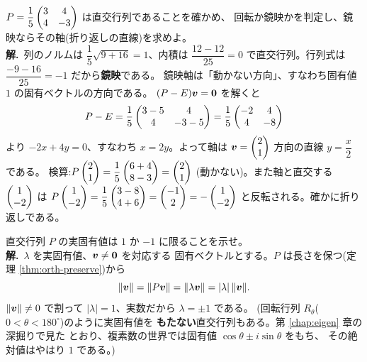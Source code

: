 \begin{rei}[例題・標準(鏡映の判定と軸)]\label{rei:orth-reflection}
$P = \dfrac{1}{5}\begin{pmatrix}3 & 4 \\ 4 & -3\end{pmatrix}$ は直交行列であることを確かめ、
回転か鏡映かを判定し、鏡映ならその軸(折り返しの直線)を求めよ。\\
\textbf{解.}\ 列のノルムは $\dfrac{1}{5}\sqrt{9 + 16} = 1$、内積は
$\dfrac{12 - 12}{25} = 0$ で直交行列。行列式は
$\dfrac{-9 - 16}{25} = -1$ だから\textbf{鏡映}である。
鏡映軸は「動かない方向」、すなわち固有値 $1$ の固有ベクトルの方向である。
$(P - E)\bm{v} = \bm{0}$ を解くと
\[
P - E = \frac{1}{5}\begin{pmatrix}3 - 5 & 4 \\ 4 & -3 - 5\end{pmatrix}
= \frac{1}{5}\begin{pmatrix}-2 & 4 \\ 4 & -8\end{pmatrix}
\]
より $-2x + 4y = 0$、すなわち $x = 2y$。よって軸は
$\bm{v} = \begin{pmatrix}2 \\ 1\end{pmatrix}$ 方向の直線 $y = \dfrac{x}{2}$ である。
検算:$P\begin{pmatrix}2 \\ 1\end{pmatrix} = \dfrac{1}{5}\begin{pmatrix}6 + 4 \\ 8 - 3\end{pmatrix} = \begin{pmatrix}2 \\ 1\end{pmatrix}$
(動かない)。また軸と直交する $\begin{pmatrix}1 \\ -2\end{pmatrix}$ は
$P\begin{pmatrix}1 \\ -2\end{pmatrix} = \dfrac{1}{5}\begin{pmatrix}3 - 8 \\ 4 + 6\end{pmatrix} = \begin{pmatrix}-1 \\ 2\end{pmatrix}
= -\begin{pmatrix}1 \\ -2\end{pmatrix}$ と反転される。確かに折り返しである。
\end{rei}

\begin{rei}[例題・標準(証明:実固有値は $\pm 1$)]\label{rei:orth-eigen}
直交行列 $P$ の実固有値は $1$ か $-1$ に限ることを示せ。\\
\textbf{解.}\ $\lambda$ を実固有値、$\bm{v} \neq \bm{0}$ を対応する
固有ベクトルとする。$P$ は長さを保つ(定理 \ref{thm:orth-preserve})から
\[
\|\bm{v}\| = \|P\bm{v}\| = \|\lambda\bm{v}\| = |\lambda|\,\|\bm{v}\|.
\]
$\|\bm{v}\| \neq 0$ で割って $|\lambda| = 1$、実数だから
$\lambda = \pm 1$ である。
(回転行列 $R_\theta$($0 < \theta < 180^\circ$)のように実固有値を
\textbf{もたない}直交行列もある。第 \ref{chap:eigen} 章の深掘りで見た
とおり、複素数の世界では固有値 $\cos\theta \pm i\sin\theta$ をもち、
その絶対値はやはり $1$ である。)
\end{rei}

